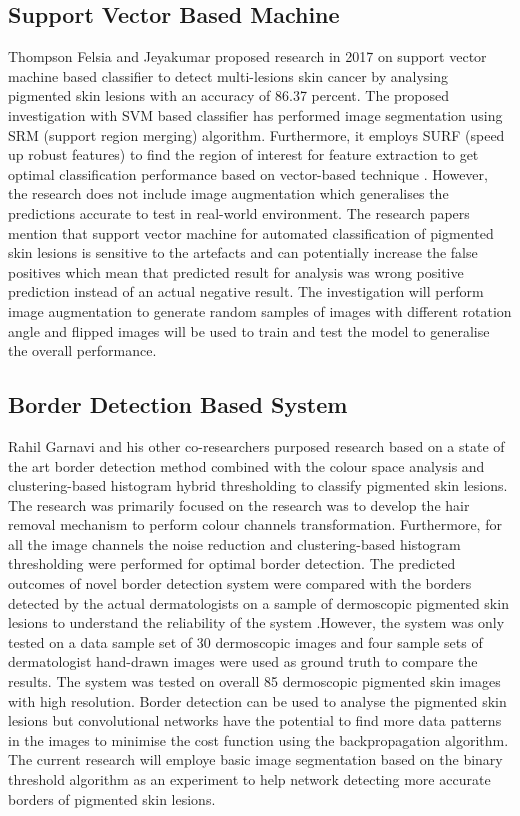 \subsection{Support Vector Based Machine}
Thompson Felsia and Jeyakumar proposed research in 2017 on 
support vector machine based classifier to detect multi-lesions skin cancer by analysing pigmented skin lesions with an accuracy of 86.37 percent.
The proposed investigation with SVM based classifier has performed image segmentation using SRM (support region merging) algorithm. Furthermore, it employs SURF (speed up robust features) to find the region 
of interest for feature extraction to get optimal classification performance based on vector-based technique \citep{thompson2017vector}. 
However, the research does not include image augmentation which generalises the predictions accurate to test in 
real-world environment. The research papers mention that support vector machine for automated classification of pigmented skin lesions is sensitive to the artefacts and can 
potentially increase the false positives which mean that predicted result for analysis was wrong positive prediction instead of an actual negative result. The investigation will perform image augmentation to generate random 
samples of images with different rotation angle and flipped images will be used to train and test the model to generalise the overall performance.

\subsection{Border Detection Based System}
Rahil Garnavi and his other co-researchers purposed research based on a state of the art border detection method combined with the colour space analysis and clustering-based histogram hybrid thresholding 
to classify pigmented skin lesions. The research was primarily focused on the research was to develop the hair removal mechanism to perform colour channels transformation. Furthermore, for all the image channels the noise reduction 
and clustering-based histogram thresholding were performed for optimal border detection. The predicted outcomes of novel border detection system were compared with the 
borders detected by the actual dermatologists on a sample of 
dermoscopic pigmented skin lesions to understand the reliability of the 
system \citep{GARNAVI2011105}.However, the system was only tested on a data sample set of 
30 dermoscopic images and four sample sets of dermatologist hand-drawn images were used as ground
truth to compare the results. The system was tested on overall 85 dermoscopic pigmented skin images 
with high resolution. Border detection can be used to analyse the pigmented skin lesions but 
convolutional networks have the potential to find more data patterns in the images to minimise 
the cost function using the backpropagation algorithm. The current research will employe basic image
segmentation based on the binary threshold algorithm as an experiment to help network detecting more accurate
borders of pigmented skin lesions.

